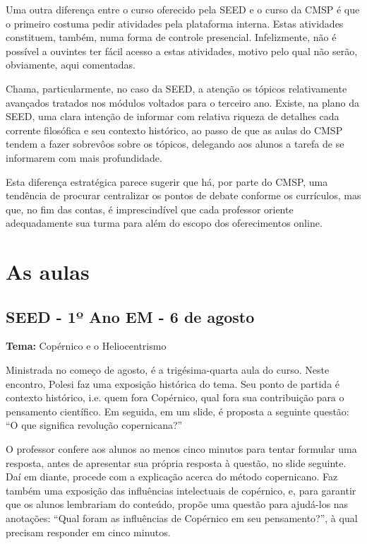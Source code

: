 \documentclass[12pt,a4paper]{article}
\begin{document}
    	Uma outra diferença entre o curso oferecido pela SEED e o curso 
    	da CMSP é que o primeiro costuma pedir atividades pela plataforma 
    	interna. Estas atividades constituem, também, numa forma de controle 
    	presencial. Infelizmente, não é possível a ouvintes ter fácil acesso 
    	a estas atividades, motivo pelo qual não serão, obviamente, aqui 
    	comentadas. 

	Chama, particularmente, no caso da SEED, a atenção os tópicos 
	relativamente avançados tratados nos módulos voltados para o 
	terceiro ano. Existe, na plano da SEED, uma clara intenção de 
	informar com relativa riqueza de detalhes cada corrente filosófica 
	e seu contexto histórico, ao passo de que as aulas do CMSP tendem 
	a fazer sobrevôos sobre os tópicos, delegando aos alunos a tarefa 
	de se informarem com mais profundidade. 

	Esta diferença estratégica parece sugerir que há, por parte do 
	CMSP, uma tendência de procurar centralizar os pontos de debate 
	conforme os currículos, mas que, no fim das contas, é imprescindível 
	que cada professor oriente adequadamente sua turma para além do 
	escopo dos oferecimentos online.   

	\newpage
	
	\section{As aulas}

	\subsection{SEED - 1º Ano EM - 6 de agosto}

	\textbf{Tema:} Copérnico e o Heliocentrismo

	Ministrada no começo de agosto, é a trigésima-quarta aula do curso. 
	Neste encontro, Polesi faz uma exposição histórica do tema. Seu 
	ponto de partida é contexto histórico, i.e. quem fora Copérnico, 
	qual fora sua contribuição para o pensamento científico. Em seguida, 
	em um slide, é proposta a seguinte questão: “O que significa revolução 
	copernicana?” 

	O professor confere aos alunos ao menos cinco minutos para tentar 
	formular uma resposta, antes de apresentar sua própria resposta à 
	questão, no slide seguinte. Daí em diante, procede com a explicação 
	acerca do método copernicano. Faz também uma exposição das influências 
	intelectuais de copérnico, e, para garantir que os alunos lembrariam 
	do conteúdo, propõe uma questão para ajudá-los nas anotações: “Qual 
	foram as influências de Copérnico em seu pensamento?”, à qual precisam 
	responder em cinco minutos. 
\end{document}
